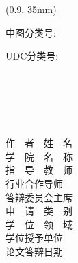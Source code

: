 \begin{titlepage}
	\begin{textblock*}{5cm}(0.9\textwidth, 35mm) %
	\end{textblock*}
	{\heiti 中图分类号: }
	\vspace{-5pt}\par {\heiti UDC分类号: }
	\begin{center}
	\vspace*{-3em}\ 
	\\	\vspace*{6em}
	\ 
	\\[0.5em]
	{\heiti\titlethesisCHNi}
	\\[0.5em]
	{\heiti\titlethesisCHNii}
	\\ \vspace*{4em}
	\end{center}
	{\heiti \makebox[90pt][l]{}作\ \ 者\ \ 姓\ \ 名\qquad\ \ \underline{\makebox[10em][c]{
	\ 
	}}}
	\\[0.5em]
	{\heiti \makebox[90pt][l]{}学\ \ 院\ \ 名\ \ 称\qquad\ \ \underline{\makebox[10em][c]{
	\ 
	}}}
	\\[0.5em]
	{\heiti \makebox[90pt][l]{}指\ \ 导\ \ 教\ \ 师\qquad\ \ \underline{\makebox[10em][c]{
	\ 
	}}}
	\\[0.5em]
	{\heiti \makebox[90pt][l]{}行业合作导师\qquad\underline{\makebox[10em][c]{
	\ 
	}}}
	\\[0.5em]
	{\heiti \makebox[90pt][l]{}答辩委员会主席\quad\underline{\makebox[10em][c]{
	\ 
	}}}
	\\[0.5em]
	{\heiti \makebox[90pt][l]{}申\ \ 请\ \ 类\ \ 别\qquad\ \ \underline{\makebox[10em][c]{
	\ 
	}}}
	\\[0.5em]
	{\heiti \makebox[90pt][l]{}学\ \ 位\ \ 领\ \ 域\qquad\ \ \underline{\makebox[10em][c]{
	\ 
	}}}
	\\[0.5em]
	{\heiti \makebox[90pt][l]{}学位授予单位\qquad\underline{\makebox[10em][c]{
	\ 
	}}}
	\\[0.5em]
	{\heiti \makebox[90pt][l]{}论文答辩日期\qquad\underline{\makebox[10em][c]{
	\ 
	}}}
	\\[1em]
	\vspace{0em}  %
	\begin{center}
	\vfill
	\end{center}
\end{titlepage}